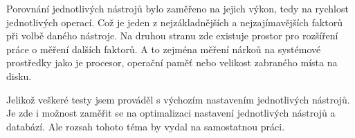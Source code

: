 Porovnání jednotlivých nástrojů bylo zaměřeno na jejich výkon, tedy na rychlost jednotlivých operací. Což je jeden z nejzákladnějších a nejzajímavějších faktorů při volbě daného nástroje. Na druhou stranu zde existuje prostor pro rozšíření práce o měření dalších faktorů. A to zejména měření nárkoů na systémové prostředky jako je procesor, operační paměť nebo velikost zabraného místa na disku.

Jelikož veškeré testy jsem prováděl s výchozím nastavením jednotlivých nástrojů. Je zde i možnost zaměřit se na optimalizaci nastavení jednotlivých nástrojů a databází. Ale rozsah tohoto téma by vydal na samostatnou práci. 




